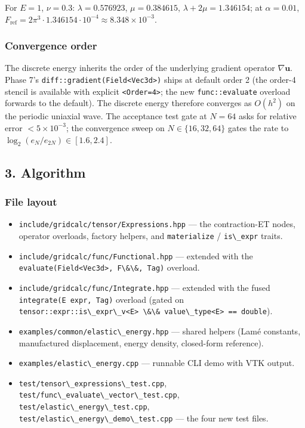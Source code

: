 For \(E = 1\), \(\nu = 0.3\): \(\lambda = 0.576923\), \(\mu = 0.384615\),
\(\lambda + 2\mu = 1.346154\); at \(\alpha = 0.01\),
\(F_{\mathrm{ref}} = 2\pi^3 \cdot 1.346154 \cdot 10^{-4}
\approx 8.348\times 10^{-3}\).

\subsubsection{Convergence order}\label{phase15-convergence}

The discrete energy inherits the order of the underlying gradient
operator \(\nabla\mathbf u\). Phase 7's
\passthrough{\lstinline!diff::gradient(Field<Vec3d>)!} ships at
default order 2 (the order-4 stencil is available with explicit
\passthrough{\lstinline!<Order=4>!}; the new
\passthrough{\lstinline!func::evaluate!} overload forwards to the
default). The discrete energy therefore converges as
\(O(h^2)\) on the periodic uniaxial wave. The acceptance test gate at
\(N = 64\) asks for relative error \(< 5\times 10^{-3}\); the
convergence sweep on \(N \in \{16, 32, 64\}\) gates the rate to
\(\log_2(e_N / e_{2N}) \in [1.6, 2.4]\).

\subsection{3. Algorithm}\label{phase15-algo}

\subsubsection{File layout}\label{phase15-files}

\begin{itemize}
\tightlist
\item
  \passthrough{\lstinline!include/gridcalc/tensor/Expressions.hpp!} ---
  the contraction-ET nodes, operator overloads, factory helpers, and
  \passthrough{\lstinline!materialize!} / \passthrough{\lstinline!is\_expr!} traits.
\item
  \passthrough{\lstinline!include/gridcalc/func/Functional.hpp!} ---
  extended with the
  \passthrough{\lstinline!evaluate(Field<Vec3d>, F\&\&, Tag)!} overload.
\item
  \passthrough{\lstinline!include/gridcalc/func/Integrate.hpp!} ---
  extended with the fused
  \passthrough{\lstinline!integrate(E expr, Tag)!} overload (gated on
  \passthrough{\lstinline!tensor::expr::is\_expr\_v<E> \&\& value\_type<E> == double!}).
\item
  \passthrough{\lstinline!examples/common/elastic\_energy.hpp!} ---
  shared helpers (Lamé constants, manufactured displacement, energy
  density, closed-form reference).
\item
  \passthrough{\lstinline!examples/elastic\_energy.cpp!} --- runnable
  CLI demo with VTK output.
\item
  \passthrough{\lstinline!test/tensor\_expressions\_test.cpp!},
  \passthrough{\lstinline!test/func\_evaluate\_vector\_test.cpp!},
  \passthrough{\lstinline!test/elastic\_energy\_test.cpp!},
  \passthrough{\lstinline!test/elastic\_energy\_demo\_test.cpp!} ---
  the four new test files.
\end{itemize}

